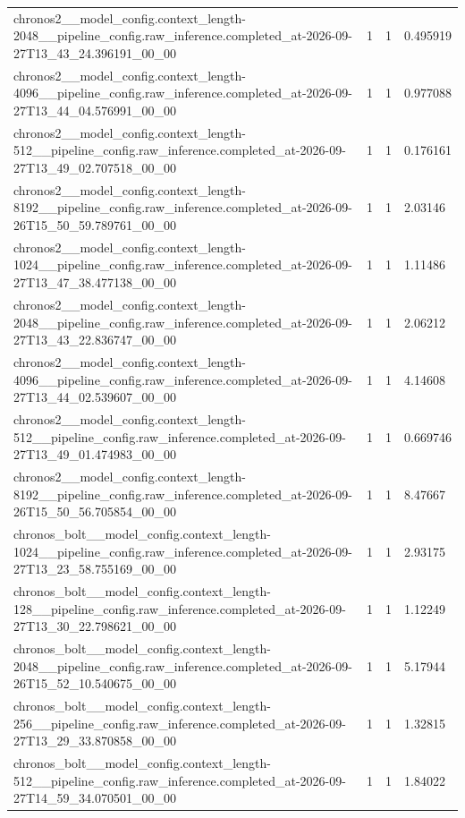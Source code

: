 \begin{tabular}{llll}
chronos2\_\_model\_config.context\_length-2048\_\_pipeline\_config.raw\_inference.completed\_at-2026-09-27T13\_43\_24.396191\_00\_00 & 1 & 1 & 0.495919 \\
chronos2\_\_model\_config.context\_length-4096\_\_pipeline\_config.raw\_inference.completed\_at-2026-09-27T13\_44\_04.576991\_00\_00 & 1 & 1 & 0.977088 \\
chronos2\_\_model\_config.context\_length-512\_\_pipeline\_config.raw\_inference.completed\_at-2026-09-27T13\_49\_02.707518\_00\_00 & 1 & 1 & 0.176161 \\
chronos2\_\_model\_config.context\_length-8192\_\_pipeline\_config.raw\_inference.completed\_at-2026-09-26T15\_50\_59.789761\_00\_00 & 1 & 1 & 2.03146 \\
chronos2\_\_model\_config.context\_length-1024\_\_pipeline\_config.raw\_inference.completed\_at-2026-09-27T13\_47\_38.477138\_00\_00 & 1 & 1 & 1.11486 \\
chronos2\_\_model\_config.context\_length-2048\_\_pipeline\_config.raw\_inference.completed\_at-2026-09-27T13\_43\_22.836747\_00\_00 & 1 & 1 & 2.06212 \\
chronos2\_\_model\_config.context\_length-4096\_\_pipeline\_config.raw\_inference.completed\_at-2026-09-27T13\_44\_02.539607\_00\_00 & 1 & 1 & 4.14608 \\
chronos2\_\_model\_config.context\_length-512\_\_pipeline\_config.raw\_inference.completed\_at-2026-09-27T13\_49\_01.474983\_00\_00 & 1 & 1 & 0.669746 \\
chronos2\_\_model\_config.context\_length-8192\_\_pipeline\_config.raw\_inference.completed\_at-2026-09-26T15\_50\_56.705854\_00\_00 & 1 & 1 & 8.47667 \\
chronos\_bolt\_\_model\_config.context\_length-1024\_\_pipeline\_config.raw\_inference.completed\_at-2026-09-27T13\_23\_58.755169\_00\_00 & 1 & 1 & 2.93175 \\
chronos\_bolt\_\_model\_config.context\_length-128\_\_pipeline\_config.raw\_inference.completed\_at-2026-09-27T13\_30\_22.798621\_00\_00 & 1 & 1 & 1.12249 \\
chronos\_bolt\_\_model\_config.context\_length-2048\_\_pipeline\_config.raw\_inference.completed\_at-2026-09-26T15\_52\_10.540675\_00\_00 & 1 & 1 & 5.17944 \\
chronos\_bolt\_\_model\_config.context\_length-256\_\_pipeline\_config.raw\_inference.completed\_at-2026-09-27T13\_29\_33.870858\_00\_00 & 1 & 1 & 1.32815 \\
chronos\_bolt\_\_model\_config.context\_length-512\_\_pipeline\_config.raw\_inference.completed\_at-2026-09-27T14\_59\_34.070501\_00\_00 & 1 & 1 & 1.84022 \\

\end{tabular}
